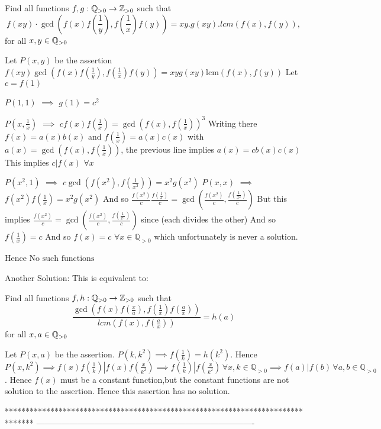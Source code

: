 \begin{solution}
	\begin{tcolorbox}Find all functions $f,g : \Bbb{Q}_{>0}\to \Bbb{Z}_{>0}$ such that $$f(xy)\cdot \gcd\left( f(x)f(\frac{1}{y}), f(\frac{1}{x})f(y)\right)
= xy.g(xy).lcm(f(x),f(y)),$$ for all $x, y \in  \Bbb{Q}_{>0}$\end{tcolorbox}
Let $P(x,y)$ be the assertion $f(xy)\gcd(f(x)f(\frac 1y),f(\frac 1x)f(y))=xyg(xy)\text{lcm}(f(x),f(y))$
Let $c=f(1)$

$P(1,1)$ $\implies$ $g(1)=c^2$

$P(x,\frac 1x)$ $\implies$ $cf(x)f(\frac 1x)=\gcd(f(x),f(\frac 1x))^3$
Writing there $f(x)=a(x)b(x)$ and $f(\frac 1x)=a(x)c(x)$ with $a(x)=\gcd(f(x),f(\frac 1x))$, the previous line implies 
$a(x)=cb(x)c(x)$
This implies $c|f(x)$ $\forall x$

$P(x^2,1)$ $\implies$ $c\gcd(f(x^2),f(\frac 1{x^2}))=x^2g(x^2)$
$P(x,x)$ $\implies$ $f(x^2)f(\frac 1x)=x^2g(x^2)$
And so $\frac{f(x^2)}c\frac{f(\frac 1x)}c=\gcd(\frac{f(x^2)}c,\frac{f(\frac 1{x^2})}c)$
But this implies $\frac{f(x^2)}c=\gcd(\frac{f(x^2)}c,\frac{f(\frac 1{x^2})}c)$ since (each divides the other)
And so $f(\frac 1x)=c$
And so $f(x)=c$ $\forall x\in\mathbb Q_{>0}$ which unfortunately is never a solution.

Hence $\boxed{\text{No such functions}}$


\end{solution}



\begin{solution}
	Another Solution:
This is equivalent to:
\begin{tcolorbox}Find all functions $f,h : \Bbb{Q}_{>0}\to \Bbb{Z}_{>0}$ such that $$\frac{\gcd\left( f(x)f(\frac{x}{a}), f(\frac{1}{x})f(\frac{a}{x})\right)}
{lcm(f(x),f(\frac{a}{x}))}=h(a)$$ for all $x, a \in  \Bbb{Q}_{>0}$\end{tcolorbox}
Let $P(x,a)$ be the assertion.
$P(k,k^2)\implies f(\frac{1}{k})=h(k^2)$.
Hence $P(x,k^2)\implies f(x)f(\frac{1}{k})|f(x)f(\frac{x}{k^2})\implies f(\frac{1}{k})|f(\frac{x}{k^2})\,\forall x,k\in\mathbb{Q}_{>0}\implies f(a)|f(b)\,\forall a,b\in\mathbb{Q}_{>0}$.
Hence $f(x)$ must be a constant function,but the constant functions are not solution to the assertion.
Hence this assertion has no solution.
\end{solution}
*******************************************************************************
-------------------------------------------------------------------------------

